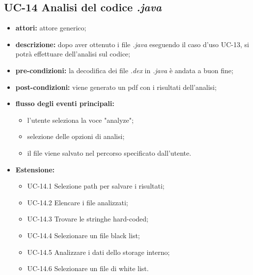 \subsection*{UC-14 Analisi del codice \textit{.java}}\label{subsec:uc-14-analisi-del-codicetextit}
\begin{itemize}
    \item \textbf{attori:} attore generico;
    \item \textbf{descrizione:} dopo aver ottenuto i file \textit{.java} eseguendo il caso d'uso UC-13, si potr\`{a} effettuare dell'analisi sul codice;
    \item \textbf{pre-condizioni:} la decodifica dei file \textit{.dex} in \textit{.java} \`{e} andata a buon fine;
    \item \textbf{post-condizioni:} viene generato un pdf con i risultati dell'analisi;
    \item \textbf{flusso degli eventi principali:}
    \begin{itemize}
        \item l'utente seleziona la voce "analyze";
        \item selezione delle opzioni di analisi;
        \item il file viene salvato nel percorso specificato dall'utente.
    \end{itemize}
    \item \textbf{Estensione:}
    \begin{itemize}
        \item UC-14.1 Selezione path per salvare i risultati;
        \item UC-14.2 Elencare i file analizzati;
        \item UC-14.3 Trovare le stringhe hard-coded;
        \item UC-14.4 Selezionare un file black list;
        \item UC-14.5 Analizzare i dati dello storage interno;
        \item UC-14.6 Selezionare un file di white list.
    \end{itemize}
\end{itemize}
